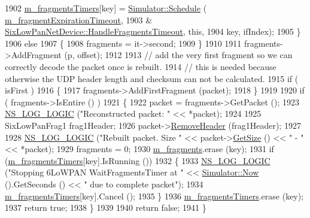 \begin{DoxyCode}
1902       \hyperlink{classns3_1_1SixLowPanNetDevice_ac1f25bfd21a90f1419db0ecf1ea82547}{m\_fragmentsTimers}[key] = \hyperlink{classns3_1_1Simulator_a671882c894a08af4a5e91181bf1eec13}{Simulator::Schedule} (
      \hyperlink{classns3_1_1SixLowPanNetDevice_ace8f2bb99c947fdaa963d8372467642c}{m\_fragmentExpirationTimeout},
1903                                                     &
      \hyperlink{classns3_1_1SixLowPanNetDevice_a9a88d53c1d9702b93470d5cbb1e526e9}{SixLowPanNetDevice::HandleFragmentsTimeout}, \textcolor{keyword}{this},
1904                                                     key, ifIndex);
1905     \}
1906   \textcolor{keywordflow}{else}
1907     \{
1908       fragments = it->second;
1909     \}
1910 
1911   fragments->AddFragment (p, offset);
1912 
1913   \textcolor{comment}{// add the very first fragment so we can correctly decode the packet once is rebuilt.}
1914   \textcolor{comment}{// this is needed because otherwise the UDP header length and checksum can not be calculated.}
1915   \textcolor{keywordflow}{if} ( isFirst )
1916     \{
1917       fragments->AddFirstFragment (packet);
1918     \}
1919 
1920   \textcolor{keywordflow}{if} ( fragments->IsEntire () )
1921     \{
1922       packet = fragments->GetPacket ();
1923       \hyperlink{group__logging_ga88acd260151caf2db9c0fc84997f45ce}{NS\_LOG\_LOGIC} (\textcolor{stringliteral}{"Reconstructed packet: "} << *packet);
1924 
1925       SixLowPanFrag1 frag1Header;
1926       packet->\hyperlink{classns3_1_1Packet_a0961eccf975d75f902d40956c93ba63e}{RemoveHeader} (frag1Header);
1927 
1928       \hyperlink{group__logging_ga88acd260151caf2db9c0fc84997f45ce}{NS\_LOG\_LOGIC} (\textcolor{stringliteral}{"Rebuilt packet. Size "} << packet->\hyperlink{classns3_1_1Packet_a462855c9929954d4301a4edfe55f4f1c}{GetSize} () << \textcolor{stringliteral}{" - "} << *packet);
1929       fragments = 0;
1930       \hyperlink{classns3_1_1SixLowPanNetDevice_aed9787c7dcee491945b752d0baa69d09}{m\_fragments}.erase (key);
1931       \textcolor{keywordflow}{if} (\hyperlink{classns3_1_1SixLowPanNetDevice_ac1f25bfd21a90f1419db0ecf1ea82547}{m\_fragmentsTimers}[key].IsRunning ())
1932         \{
1933           \hyperlink{group__logging_ga88acd260151caf2db9c0fc84997f45ce}{NS\_LOG\_LOGIC} (\textcolor{stringliteral}{"Stopping 6LoWPAN WaitFragmentsTimer at "} << 
      \hyperlink{classns3_1_1Simulator_ac3178fa975b419f7875e7105be122800}{Simulator::Now} ().GetSeconds () << \textcolor{stringliteral}{" due to complete packet"});
1934           \hyperlink{classns3_1_1SixLowPanNetDevice_ac1f25bfd21a90f1419db0ecf1ea82547}{m\_fragmentsTimers}[key].Cancel ();
1935         \}
1936       \hyperlink{classns3_1_1SixLowPanNetDevice_ac1f25bfd21a90f1419db0ecf1ea82547}{m\_fragmentsTimers}.erase (key);
1937       \textcolor{keywordflow}{return} \textcolor{keyword}{true};
1938     \}
1939 
1940   \textcolor{keywordflow}{return} \textcolor{keyword}{false};
1941 \}
\end{DoxyCode}


